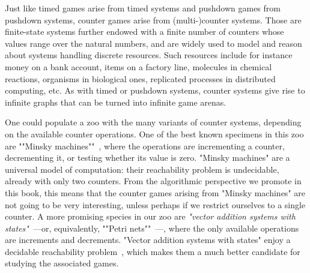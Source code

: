 



Just like timed games arise from timed systems and pushdown games
from pushdown systems, counter games arise from (multi-)counter
systems.  Those are finite-state systems further endowed with a
finite number of counters whose values range over the natural numbers,
and are widely used to model and reason about systems handling
discrete resources.  Such resources include for instance money on a
bank account, items on a factory line, molecules in chemical
reactions, organisms in biological ones, replicated processes in
distributed computing, etc.  As with timed or pushdown systems,
counter systems give rise to infinite graphs that can be turned into
infinite game arenas.

\AP One could populate a zoo with the many variants of counter systems,
depending on the available counter operations.  One of the best known
specimens in this zoo are ""Minsky machines""~\cite{Minsky:1967},
where the operations are incrementing a counter, decrementing it, or
testing whether its value is zero.  "Minsky machines" are a universal
model of computation: their reachability problem is undecidable,
already with only two counters.  From the algorithmic perspective we
promote in this book, this means that the counter games arising from
"Minsky machines" are not going to be very interesting, unless perhaps
if we restrict ourselves to a single counter.  A more promising
species in our zoo are \emph{"vector addition systems with
  states"}~\cite{Greibach:1978,Hopcroft&Pansiot:1979}---or,
equivalently, ""Petri nets""~\cite{Petri:1962}---, where the only
available operations are increments and decrements.  "Vector addition
systems with states" enjoy a decidable reachability
problem~\cite{Mayr:1981,Kosaraju:1982,Lambert:1992,Leroux:2011}, which
makes them a much better candidate for studying the associated games.

